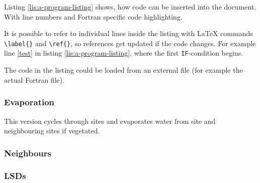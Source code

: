Listing \ref{lis:a-program-listing} shows, how code can be inserted
into the document. With line numbers and Fortran specific code highlighting. 

It is possible to refer to individual lines inside the listing with
\LaTeX{} commands \texttt{\textbackslash{}label\{\}} and \texttt{\textbackslash{}ref\{\}},
so references get updated if the code changes. For example line \ref{test}
in listing \ref{lis:a-program-listing}, where the first \texttt{IF}-condition
begins.

The code in the listing could be loaded from an external file (for
example the actual Fortran file). 


\subsubsection{Evaporation}


This version cycles through sites and evaporates water from site and
neighbouring sites if vegetated.


\begin{usessubs}
\end{usessubs}

\subsubsection{Neighbours}



\subsubsection{LSDs}

